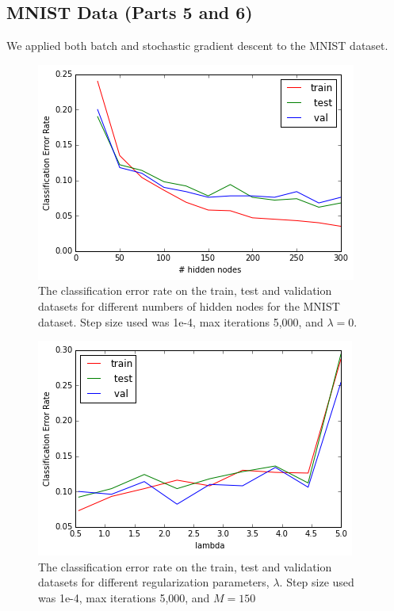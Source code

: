\documentclass[10pt]{article}
\begin{document}
\subsection*{MNIST Data (Parts 5 and 6)}

We applied both batch and stochastic gradient descent to the MNIST dataset.

%
\begin{figure}
\centering
\includegraphics[scale=0.5]{MNIST_batch_varyM.png}
\caption{The classification error rate on the train, test and validation datasets for different numbers of hidden nodes for the MNIST dataset.  Step size used was 1e-4, max iterations 5,000, and $\lambda=0$.}
\label{MNIST_batch_varyM}
\end{figure}
%
\begin{figure}
\centering
\includegraphics[scale=0.5]{MNIST_reg_batch.png}
\caption{The classification error rate on the train, test and validation datasets for different regularization parameters, $\lambda$.  Step size used was 1e-4, max iterations 5,000, and $M=150$}
\label{MNIST_reg_batch}
\end{figure}
\end{document}
